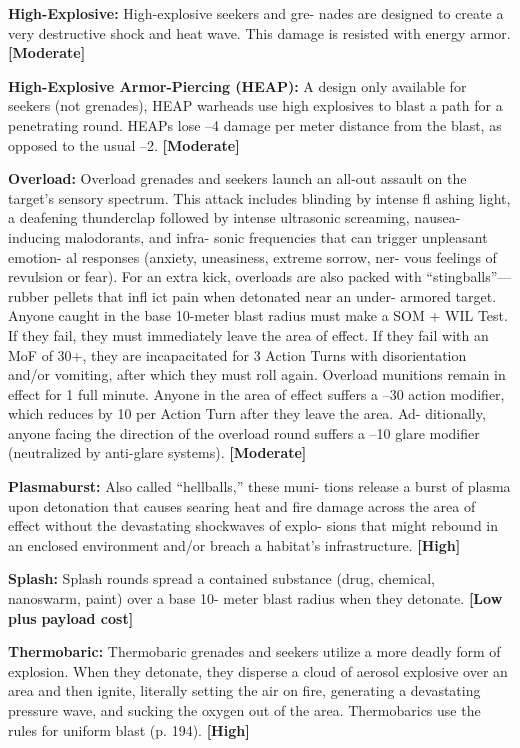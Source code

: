 \textbf{High-Explosive:  }High-explosive seekers and gre-
nades are designed to create a very destructive shock 
and heat wave. This damage is resisted with energy 
armor. \textbf{[Moderate]}

\textbf{High-Explosive Armor-Piercing (HEAP):} A design 
only available for seekers (not grenades), HEAP 
warheads use high explosives to blast a path for 
a penetrating round. HEAPs lose –4 damage per 
meter distance from the blast, as opposed to the 
usual –2. \textbf{[Moderate]}

\textbf{Overload:} Overload grenades and seekers launch an 
all-out assault on the target's sensory spectrum. This 
attack includes blinding by intense fl ashing light, a 
deafening thunderclap followed by intense ultrasonic 
screaming, nausea-inducing malodorants, and infra-
sonic frequencies that can trigger unpleasant emotion-
al responses (anxiety, uneasiness, extreme sorrow, ner-
vous feelings of revulsion or fear). For an extra kick, 
overloads are also packed with ``stingballs''—rubber 
pellets that infl ict pain when detonated near an under-
armored target. Anyone caught in the base 10-meter 
blast radius must make a SOM + WIL Test. If they fail, 
they must immediately leave the area of effect. If they 
fail with an MoF of 30+, they are incapacitated for 
3 Action Turns with disorientation and/or vomiting, 
after which they must roll again. Overload munitions 
remain in effect for 1 full minute. Anyone in the area 
of effect suffers a –30 action modifier, which reduces 
by 10 per Action Turn after they leave the area. Ad-
ditionally, anyone facing the direction of the overload 
round suffers a –10 glare modifier (neutralized by 
anti-glare systems). \textbf{[Moderate]}

\textbf{Plasmaburst:} Also called ``hellballs,'' these muni-
tions release a burst of plasma upon detonation that 
causes searing heat and fire damage across the area of 
effect without the devastating shockwaves of explo-
sions that might rebound in an enclosed environment 
and/or breach a habitat's infrastructure. \textbf{[High]}

\textbf{Splash:} Splash rounds spread a contained substance 
(drug, chemical, nanoswarm, paint) over a base 10-
meter blast radius when they detonate. \textbf{[Low plus }
\textbf{payload cost]}

\textbf{Thermobaric:} Thermobaric grenades and seekers 
utilize a more deadly form of explosion. When they 
detonate, they disperse a cloud of aerosol explosive 
over an area and then ignite, literally setting the air 
on fire, generating a devastating pressure wave, and 
sucking the oxygen out of the area. Thermobarics use 
the rules for uniform blast (p. 194). \textbf{[High]}

